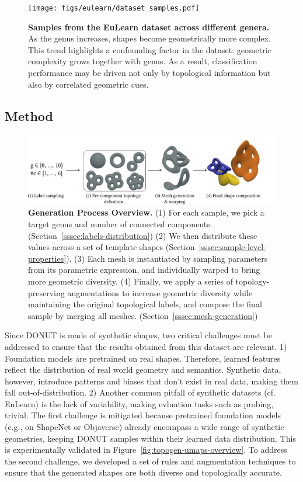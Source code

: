 \begin{figure}[h]
  \centering
  \texttt{[image: figs/eulearn/dataset\_samples.pdf]}
   \caption{\textbf{Samples from the EuLearn dataset across different genera.} As the genus increases, shapes become geometrically more complex. This trend highlights a confounding factor in the dataset: geometric complexity grows together with genus. As a result, classification performance may be driven not only by topological information but also by correlated geometric cues.}
   \label{fig:eulearn-samples}
\end{figure}


\subsection{Method}
\label{ssec:topogen-method}

\begin{figure}[t]
  \centering
  \includegraphics[width=1.0\linewidth]{figs/topogen/topogen_gen.pdf}
   \caption{\textbf{Generation Process Overview.} (1) For each sample, we pick a target genus and number of connected components. (Section~\ref{sssec:labels-distribution}) (2) We then distribute these values across a set of template shapes (Section~\ref{sssec:sample-level-properties}). (3) Each mesh is instantiated by sampling parameters from its parametric expression, and individually warped to bring more geometric diversity. (4) Finally, we apply a series of topology-preserving augmentations to increase geometric diversity while maintaining the original topological labels, and compose the final sample by merging all meshes. (Section~\ref{sssec:mesh-generation})}
   \label{fig:topogen-overview}
\end{figure}

Since DONUT is made of synthetic shapes, two critical challenges must be addressed to ensure that the results obtained from this dataset are relevant. 1) Foundation models are pretrained on real shapes. Therefore, learned features reflect the distribution of real world geometry and semantics. Synthetic data, however, introduce patterns and biases that don't exist in real data, making them fall out-of-distribution. 2) Another common pitfall of synthetic datasets (cf. EuLearn) is the lack of variability, making evluation tasks such as probing, trivial. The first challenge is mitigated because pretrained foundation models (e.g., on ShapeNet or Objaverse) already encompass a wide range of synthetic geometries, keeping DONUT samples within their learned data distribution. This is experimentally validated in Figure~\ref{fig:topogen-umaps-overview}. To address the second challenge, we developed a set of rules and augmentation techniques to ensure that the generated shapes are both diverse and topologically accurate.

